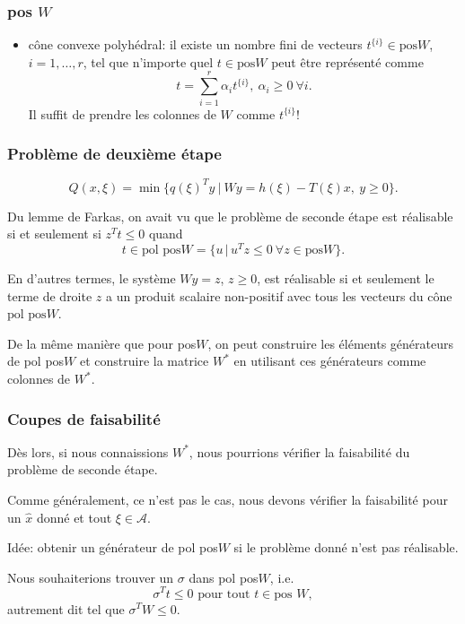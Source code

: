\begin{frame}
	\frametitle{pos $W$}
	
	\begin{itemize}
		\item
		cône convexe polyhédral: il existe un nombre fini de vecteurs
		$t^{\lbrace i \rbrace} \in \mbox{pos}W$, $i = 1,\ldots,r$, tel que
		n'importe quel $t \in \mbox{pos}W$ peut être représenté comme
		\[
		t = \sum_{i=1}^r \alpha_i t^{\lbrace i \rbrace},\ \alpha_i \geq 0\
		\forall i.
		\]
		Il suffit de prendre les colonnes de $W$ comme $t^{\lbrace i \rbrace}$!
	\end{itemize}
	
	
\end{frame}

\begin{frame}
	\frametitle{Problème de deuxième étape}
	
	\[
	Q(x,\xi){=} \min \lbrace q(\xi)^Ty \ |\ Wy = h(\xi) - T(\xi)x,\ y \geq 0 \rbrace.
	\]
	
	\mbox{}
	
	Du lemme de Farkas, on avait vu que le problème de seconde étape est
	réalisable si et seulement si $z^Tt \leq 0$ quand 
	\[
	t \in \mbox{pol pos} W =
	\lbrace u \,|\, u^Tz \leq 0\ \forall z \in \mbox{pos} W \rbrace.
	\]
	
	\mbox{}
	
	En d'autres termes, le système $Wy = z$, $z \geq 0$, est réalisable si
	et seulement le terme de droite $z$ a un produit scalaire non-positif
	avec tous les vecteurs du cône $\mbox{pol pos} W$.
	
	\mbox{}
	
	De la même manière que pour pos$W$, on peut construire les éléments
	générateurs de pol pos$W$ et construire la matrice $W^*$ en utilisant
	ces générateurs comme colonnes de $W^*$.
\end{frame}

\begin{frame}
	\frametitle{Coupes de faisabilité}
	
	Dès lors, si nous connaissions $W^*$, nous pourrions vérifier la
	faisabilité du problème de seconde étape.
	
	\mbox{}
	
	Comme généralement, ce n'est pas le cas, nous devons vérifier la
	faisabilité pour un $\hat{x}$ donné et tout $\xi \in \mathcal{A}$.
	
	Idée: obtenir un générateur de pol pos$W$  si le problème donné n'est
	pas réalisable.
	
	\mbox{}
	
	Nous souhaiterions trouver un $\sigma$ dans pol pos$W$, i.e.
	\[
	\sigma^Tt \leq 0 \mbox{ pour tout } t \in \mbox{pos }W,
	\]
	autrement dit tel que $\sigma^TW \leq 0$.
	
\end{frame}


